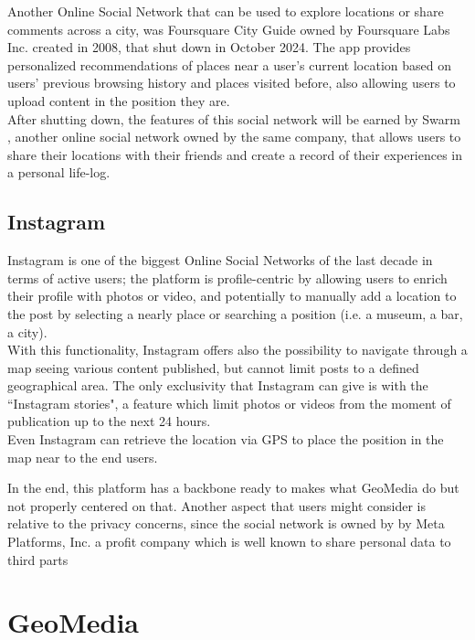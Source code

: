 \documentclass[conference]{IEEEtran}
\begin{document}
Another Online Social Network that can be used to explore locations or share comments across a city, was Foursquare City Guide\cite{FourSquareWiki} owned by Foursquare Labs Inc. \cite{FoursquareOfficialLink} created in 2008, that shut down in October 2024.
The app provides personalized recommendations of places near a user's current location based on users' previous browsing history and places visited before, also allowing users to upload content in the position they are.
\\
After shutting down, the features of this social network will be earned by Swarm \cite{FoursquareSwarm}, another online social network owned by the same company, that allows users to share their locations with their friends and create a record of their experiences in a personal life-log.

\subsection{Instagram}
Instagram \cite{Instagram} is one of the biggest Online Social Networks of the last decade in terms of active users; the platform is profile-centric by allowing users to enrich their profile with photos or video, and potentially to manually add a location to the post by selecting a nearly place or searching a position (i.e. a museum, a bar, a city).
\\
With this functionality, Instagram offers also the possibility to navigate through a map seeing various content published, but cannot limit posts to a defined geographical area.
The only exclusivity that Instagram can give is with the ``Instagram stories", a feature which limit photos or videos from the moment of publication up to the next 24 hours.
\\
Even Instagram can retrieve the location via GPS to place the position in the map near to the end users.

In the end, this platform has a backbone ready to makes what GeoMedia do but not properly centered on that. Another aspect that users might consider is relative to the privacy concerns, since the social network is owned by by Meta Platforms, Inc. a profit company which is well known to share personal data to third parts\cite{MetaPrivacy}



\section{GeoMedia}
\end{document}
